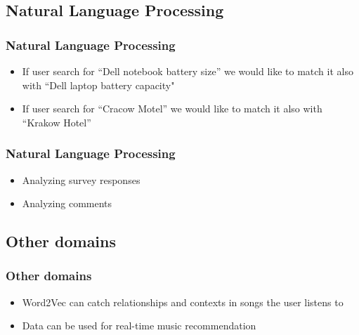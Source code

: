 
\subsection{Natural Language Processing}


\begin{frame}
	\frametitle{Natural Language Processing}
	
	\begin{itemize}
		\item If user search for ``Dell notebook battery size'' we would like to match it also with ``Dell laptop battery capacity"
		\item If user search for ``Cracow Motel'' we would like to match it also with ``Krakow Hotel''
	\end{itemize}
	
\end{frame}


\begin{frame}
\frametitle{Natural Language Processing}

\begin{itemize}
	\item Analyzing survey responses
	\item Analyzing comments
\end{itemize}

\end{frame}


\subsection{Other domains}


\begin{frame}
\frametitle{Other domains}

\begin{itemize}
	\item Word2Vec can catch relationships and contexts in songs the user listens to
	\item Data can be used for real-time music recommendation
\end{itemize}

\end{frame}

